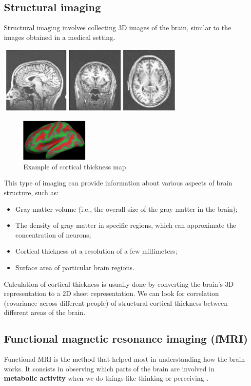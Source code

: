 \subsection{Structural imaging}
Structural imaging involves collecting 3D images of the brain, similar to the images obtained in a medical setting.

\begin{center}
\includegraphics[width=0.7\textwidth]{images/structural_imaging.png}
\end{center}

\begin{figure}
  \centering \includegraphics[width=0.3\textwidth]{images/thickness.png}
  \caption*{Example of cortical thickness map.}
\end{figure}
This type of imaging can provide information about various aspects of brain 
structure, such as:

\begin{itemize}
    \item Gray matter volume (i.e., the overall size of the gray matter in the brain);
    \item The density of gray matter in specific regions, which can approximate the concentration of neurons;
    \item Cortical thickness at a resolution of a few millimeters;
    \item Surface area of particular brain regions.
\end{itemize}

Calculation of cortical thickness is usually done by converting the brain's 3D representation to a 2D sheet representation.
We can look for correlation (covariance across different people) of structural cortical thickness between different areas of the brain.

\subsection{Functional  magnetic resonance imaging (fMRI)}
Functional MRI is the method that helped most in understanding how the brain works. It consists in observing which parts of the brain are involved in \textbf{metabolic activity} when we do things like thinking or perceiving \notet.

